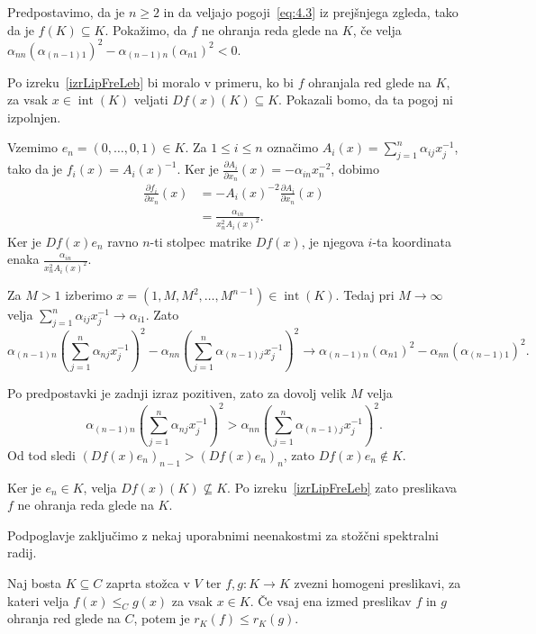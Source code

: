 \documentclass[mat2, tisk]{fmfdelo}
\begin{document}
\begin{zgled}
  Predpostavimo, da je $n\geq2$ in da veljajo pogoji~\eqref{eq:4.3} iz prejšnjega zgleda,
  tako da je $f(K)\subseteq K$.
  Pokažimo, da $f$ ne ohranja reda glede na $K$, če velja
  $\alpha_{nn}(\alpha_{(n-1)1})^2-\alpha_{(n-1)n}(\alpha_{n1})^2<0$. 

  Po izreku~\ref{izrLipFreLeb} bi moralo v primeru, ko bi $f$ ohranjala red glede na $K$, za vsak
  $x\in\operatorname{int}(K)$ veljati $Df(x)(K)\subseteq K$. Pokazali bomo, da ta
  pogoj ni izpolnjen.

  Vzemimo $e_n=(0,\ldots,0,1)\in K$. Za $1\leq i\leq n$ označimo
  $A_i(x)=\sum\limits_{j=1}^n\alpha_{ij}x_j^{-1}$, tako da je
  $f_i(x)=A_i(x)^{-1}$. Ker je
  $\frac{\partial A_i}{\partial x_n}(x)=-\alpha_{in}x_n^{-2}$, dobimo
  \begin{align*}
  \frac{\partial f_i}{\partial x_n}(x)
  &=-A_i(x)^{-2}\frac{\partial A_i}{\partial x_n}(x) \\
  &=\frac{\alpha_{in}}{x_n^2A_i(x)^2}.
  \end{align*}
  Ker je $Df(x)e_n$ ravno $n$-ti stolpec matrike $Df(x)$, je njegova $i$-ta
  koordinata enaka
  $\frac{\alpha_{in}}{x_n^2A_i(x)^2}$.

  Za $M>1$ izberimo
  $x=(1,M,M^2,\ldots,M^{n-1})\in\operatorname{int}(K)$. Tedaj pri
  $M\to\infty$ velja
  $\sum\limits_{j=1}^n\alpha_{ij}x_j^{-1}\to\alpha_{i1}$. Zato
  \[\alpha_{(n-1)n}
  \left(\sum\limits_{j=1}^n\alpha_{nj}x_j^{-1}\right)^2
  -
  \alpha_{nn}
  \left(\sum\limits_{j=1}^n\alpha_{(n-1)j}x_j^{-1}\right)^2
  \longrightarrow
  \alpha_{(n-1)n}(\alpha_{n1})^2
  -
  \alpha_{nn}(\alpha_{(n-1)1})^2.\]

  Po predpostavki je zadnji izraz pozitiven, zato za dovolj velik $M$ velja
  \[
  \alpha_{(n-1)n}
  \left(\sum\limits_{j=1}^n\alpha_{nj}x_j^{-1}\right)^2
  >
  \alpha_{nn}
  \left(\sum\limits_{j=1}^n\alpha_{(n-1)j}x_j^{-1}\right)^2.
  \]
  Od tod sledi
  $(Df(x)e_n)_{n-1}>(Df(x)e_n)_n$, zato $Df(x)e_n\notin K$.

  Ker je $e_n\in K$, velja $Df(x)(K)\nsubseteq K$. Po izreku~\ref{izrLipFreLeb} zato
  preslikava $f$ ne ohranja reda glede na $K$.
\end{zgled}

Podpoglavje zaključimo z nekaj uporabnimi neenakostmi za stožčni
spektralni radij.

\begin{trditev}\label{trd:monotonost_stozcnega_spektralnega_radija}
  Naj bosta $K\subseteq C$ zaprta stožca v $V$ ter
  $f,g\colon K\longrightarrow K$ zvezni homogeni preslikavi, za kateri
  velja $f(x)\leq_Cg(x)$ za vsak $x\in K$. Če vsaj ena izmed preslikav
  $f$ in $g$ ohranja red glede na $C$, potem je
  $r_K(f)\leq r_K(g)$.
\end{trditev}
\end{document}
